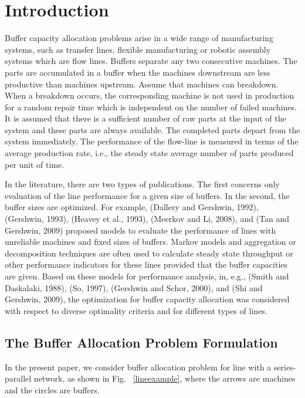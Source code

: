 \documentclass{ifacconf}
\begin{document}
\section{Introduction}

Buffer  capacity  allocation  problems  arise  in  a  wide  range  of  manufacturing  systems, 
such  as  transfer  lines,  flexible  manufacturing  or  robotic  assembly  systems  which  are 
flow lines. Buffers separate any two consecutive machines. The parts are accumulated in
a buffer when the machines downstream are less productive than machines upstream. 
Assume that machines can breakdown. When a breakdown occurs, the corresponding 
machine is not used in production for a random repair time which is independent on the 
number of failed machines. It is assumed that there is a sufficient number of raw parts at 
the input of the system and these parts are always available. The completed parts depart 
from the system immediately. The performance of the flow-line is measured in terms of 
the average production rate, i.e., the steady state average number of parts produced per 
unit of time.

In the literature, there are two types of publications. The first concerns only evaluation 
of the line performance for a given size of buffers. In the second, the buffer sizes are 
optimized. For example, (Dallery and Gershwin, 1992), (Gershwin, 1993), (Heavey et 
al., 1993), (Meerkov and Li, 2008), and (Tan and Gershwin, 2009) proposed models to 
evaluate the performance of lines with unreliable machines and fixed sizes of buffers. 
Markov models and aggregation or decomposition techniques are often used to calculate 
steady state throughput or other performance indicators for these lines provided that the 
buffer  capacities  are  given.  Based  on  these  models  for  performance  analysis,  in,  e.g., 
(Smith  and  Daskalaki,  1988),  (So,  1997),  (Gershwin  and  Schor,  2000),  and  (Shi  and 
Gershwin,  2009),  the  optimization  for  buffer  capacity  allocation  was  considered  with 
respect to diverse optimality criteria and for different types of lines.

\subsection{The Buffer Allocation Problem Formulation} \label{bap_formulation}

In the present paper, we consider buffer allocation problem for line with a series-parallel network, as shown in Fig. ~\ref{lineexample}, where the arrows are machines and the circles are buffers.
\end{document}

